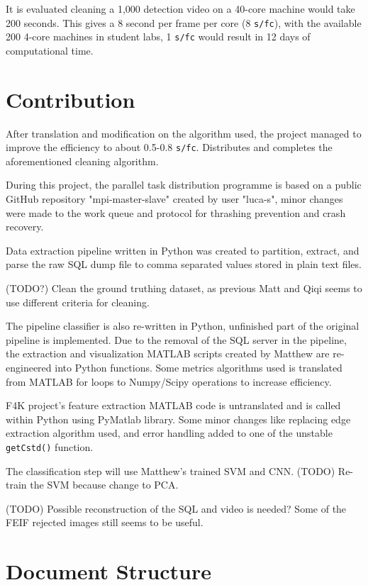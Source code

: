 \documentclass[bsc,logo,twoside,fullspacing,parskip]{infthesis}
\begin{document}
It is evaluated cleaning a 1,000 detection video on a 40-core machine would take 200 seconds.
This gives a 8 second per frame per core (8 {\tt s/fc}), with the available 200 4-core machines in student labs, 1 {\tt s/fc} would result in 12 days of computational time.

\section{Contribution}

After translation and modification on the algorithm used, the project managed to improve the efficiency to about 0.5-0.8 {\tt s/fc}. Distributes and completes the aforementioned cleaning algorithm.

During this project, the parallel task distribution programme is based on a public GitHub repository "mpi-master-slave" created by user "luca-s"\cite{L5}, minor changes were made to the work queue and protocol for thrashing prevention and crash recovery.

Data extraction pipeline written in Python was created to partition, extract, and parse the raw SQL dump file to comma separated values stored in plain text files. 

(TODO?) Clean the ground truthing dataset, as previous Matt and Qiqi seems to use different criteria for cleaning.

The pipeline classifier is also re-written in Python, unfinished part of the original pipeline is implemented. 
Due to the removal of the SQL server in the pipeline, the extraction and visualization MATLAB scripts created by Matthew are re-engineered into Python functions. 
Some metrics algorithms used is translated from MATLAB for loops to Numpy/Scipy operations to increase efficiency.

F4K project's feature extraction MATLAB code is untranslated and is called within Python using PyMatlab library. Some minor changes like replacing edge extraction algorithm used, and error handling added to one of the unstable {\tt getCstd()} function. 

The classification step will use Matthew's trained SVM and CNN. (TODO) Re-train the SVM because change to PCA.

(TODO) Possible reconstruction of the SQL and video is needed? Some of the FEIF rejected images still seems to be useful.

\section{Document Structure}
\end{document}
